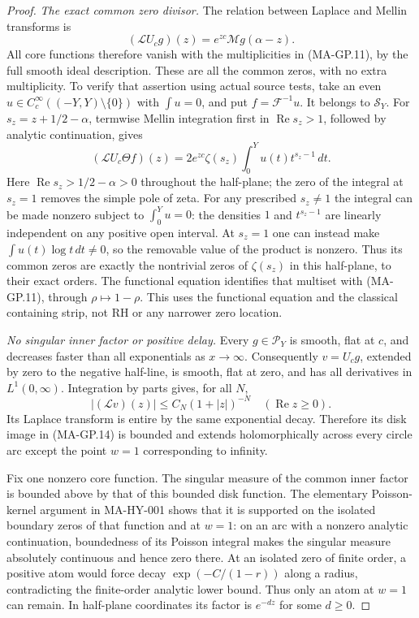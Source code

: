 \begin{proof}
\emph{The exact common zero divisor.}
The relation between Laplace and Mellin transforms is
\[
 (\mathcal L U_cg)(z)=e^{zc}\mathcal Mg(\alpha-z).
 \tag{MA-GP.15}
\]
All core functions therefore vanish with the multiplicities
in (MA-GP.11), by the full smooth ideal description.
These are all the common zeros, with no extra multiplicity.
To verify that assertion using actual source tests, take
an even $u\in C_c^\infty((-Y,Y)\setminus\{0\})$ with
$\int u=0$, and put $f=\mathcal F^{-1}u$.
It belongs to $\mathscr S_Y$.  For
$s_z=z+1/2-\alpha$, termwise Mellin integration first in
$\operatorname{Re}s_z>1$, followed by analytic continuation,
gives
\[
 (\mathcal L U_c\Theta f)(z)
       =2e^{zc}\zeta(s_z)
                    \int_0^Y u(t)t^{s_z-1}\,dt.
 \tag{MA-GP.16}
\]
Here $\operatorname{Re}s_z>1/2-\alpha>0$ throughout the
half-plane; the zero of the integral at $s_z=1$ removes
the simple pole of zeta.
For any prescribed $s_z\ne1$ the integral can be made
nonzero subject to $\int_0^Y u=0$: the densities
$1$ and $t^{s_z-1}$ are linearly independent on any
positive open interval.  At $s_z=1$ one can instead
make $\int u(t)\log t\,dt\ne0$, so the removable value
of the product is nonzero.
Thus its common zeros are exactly the nontrivial zeros
of $\zeta(s_z)$ in this half-plane, to their exact orders.
The functional equation identifies that multiset with
(MA-GP.11), through $\rho\mapsto1-\rho$.
This uses the functional equation and the classical
containing strip, not RH or any narrower zero location.

\emph{No singular inner factor or positive delay.}
Every $g\in\mathscr P_Y$ is smooth, flat at $c$, and
decreases faster than all exponentials as $x\to\infty$.
Consequently $v=U_cg$, extended by zero to the negative
half-line, is smooth, flat at zero, and has all derivatives
in $L^1(0,\infty)$.
Integration by parts gives, for all $N$,
\[
 |(\mathcal Lv)(z)|\le C_N(1+|z|)^{-N}
                       \quad(\operatorname{Re}z\ge0).
 \tag{MA-GP.17}
\]
Its Laplace transform is entire by the same exponential
decay.  Therefore its disk image in (MA-GP.14) is bounded
and extends holomorphically across every circle arc
except the point $w=1$ corresponding to infinity.

Fix one nonzero core function.  The singular measure of
the common inner factor is bounded above by that of this
bounded disk function.  The elementary Poisson-kernel
argument in MA-HY-001 shows that it is supported on the
isolated boundary zeros of that function and at $w=1$:
on an arc with a nonzero analytic continuation,
boundedness of its Poisson integral makes the singular
measure absolutely continuous and hence zero there.
At an isolated zero of finite order, a positive atom
would force decay $\exp(-C/(1-r))$ along a radius,
contradicting the finite-order analytic lower bound.
Thus only an atom at $w=1$ can remain.  In half-plane
coordinates its factor is $e^{-dz}$ for some $d\ge0$.


\end{proof}
